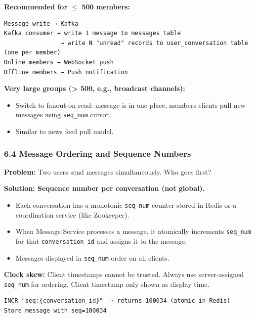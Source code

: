 \documentclass[11pt]{article}
\providecommand{\tightlist}{\setlength{\itemsep}{1pt}\setlength{\parskip}{0pt}}
\begin{document}
\textbf{Recommended for \(\leq\) 500 members:}

\setcodelang{}

\begin{verbatim}
Message write → Kafka
Kafka consumer → write 1 message to messages table
                → write N "unread" records to user_conversation table (one per member)
Online members → WebSocket push
Offline members → Push notification
\end{verbatim}

\textbf{Very large groups (\textgreater{} 500, e.g., broadcast channels):}

\begin{itemize}
\tightlist
\item
  Switch to fanout-on-read: message is in one place, members\textquotesingle{} clients pull new messages using \texttt{seq\_num} cursor.
\item
  Similar to news feed pull model.
\end{itemize}

\subsubsection{6.4 Message Ordering and Sequence Numbers}\label{64-message-ordering-and-sequence-numbers}

\textbf{Problem:} Two users send messages simultaneously. Who goes first?

\textbf{Solution: Sequence number per conversation (not global).}

\begin{itemize}
\tightlist
\item
  Each conversation has a monotonic \texttt{seq\_num} counter stored in Redis or a coordination service (like Zookeeper).
\item
  When Message Service processes a message, it atomically increments \texttt{seq\_num} for that \texttt{conversation\_id} and assigns it to the message.
\item
  Messages displayed in \texttt{seq\_num} order on all clients.
\end{itemize}

\textbf{Clock skew:} Client timestamps cannot be trusted. Always use server-assigned \texttt{seq\_num} for ordering. Client timestamp only shown as display time.

\setcodelang{}

\begin{verbatim}
INCR "seq:{conversation_id}"  → returns 100034 (atomic in Redis)
Store message with seq=100034
\end{verbatim}
\end{document}
